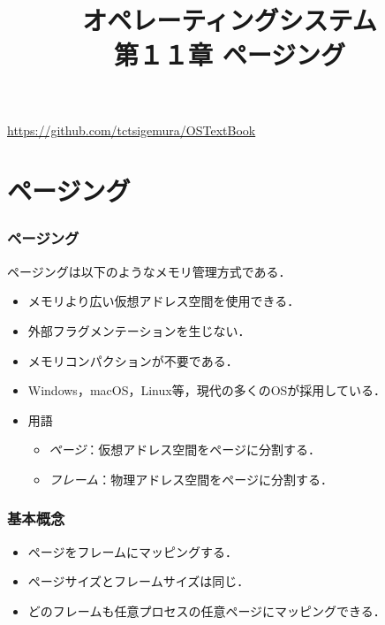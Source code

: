 \documentclass[unicode]{beamer}                   %
\begin{document}
\title[ページング]
      {オペレーティングシステム\\第１１章 ページング}
\date{}
\begin{frame}
  \titlepage
  \centerline{\url{https://github.com/tctsigemura/OSTextBook}}
\end{frame}


\section{ページング}
\begin{frame}
  \frametitle{ページング}
  ページングは以下のようなメモリ管理方式である．
  \begin{itemize}
  \item メモリより広い仮想アドレス空間を使用できる．
  \item 外部フラグメンテーションを生じない．
  \item メモリコンパクションが不要である．
  \item Windows，macOS，Linux等，現代の多くのOSが採用している．
  \item 用語
    \begin{itemize}
      \item \emph{ページ}：仮想アドレス空間をページに分割する．
      \item \emph{フレーム}：物理アドレス空間をページに分割する．
    \end{itemize}
  \end{itemize}
\end{frame}

\begin{frame}
  \frametitle{基本概念}
  \begin{itemize}
  \item ページをフレームにマッピングする．
  \item ページサイズとフレームサイズは同じ．
  \item どのフレームも任意プロセスの任意ページにマッピングできる．
  \end{itemize}
\end{frame}
\end{document}
